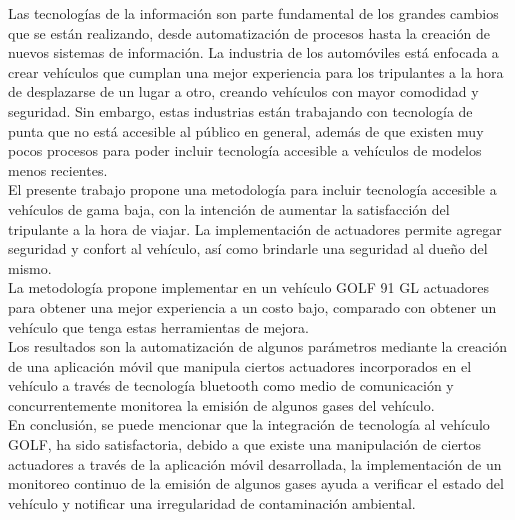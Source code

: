 Las tecnologías de la información son parte fundamental de los grandes cambios que se están realizando, desde automatización de procesos hasta la creación de nuevos sistemas de información. La industria de los automóviles está enfocada a crear vehículos que cumplan una mejor experiencia para los tripulantes a la hora de desplazarse de un lugar a otro, creando vehículos con mayor comodidad y seguridad. Sin embargo, estas industrias están trabajando con tecnología de punta que no está accesible al público en general, además de que existen muy pocos procesos para poder incluir tecnología accesible a vehículos de modelos menos recientes.\\[\separacionCorta]

El presente trabajo propone una metodología para incluir tecnología accesible a vehículos de gama baja, con la intención de aumentar la satisfacción del tripulante a la hora de viajar. La implementación de actuadores permite agregar seguridad y confort al vehículo, así como brindarle una seguridad al dueño del mismo.\\[\separacionCorta]

La metodología propone implementar en un vehículo GOLF 91 GL actuadores para obtener una mejor experiencia a un costo bajo, comparado con obtener un vehículo que tenga estas herramientas de mejora.\\[\separacionCorta]

Los resultados son la automatización de algunos parámetros mediante la creación de una aplicación móvil que manipula ciertos actuadores incorporados en el vehículo a través de tecnología bluetooth como medio de comunicación y concurrentemente monitorea la emisión de algunos gases del vehículo.\\[\separacionCorta]

En conclusión, se puede mencionar que la integración de tecnología al vehículo GOLF, ha sido satisfactoria, debido a que existe una manipulación de ciertos actuadores a través de la aplicación móvil desarrollada, la implementación de un monitoreo continuo de la emisión de algunos gases ayuda a verificar el estado del vehículo y notificar una irregularidad de contaminación ambiental.\\[\separacionCorta]
